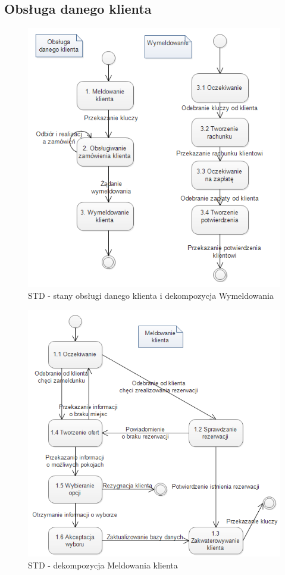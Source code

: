 \documentclass[a4paper, 11pt]{article}
\begin{document}
	\subsection{Obsługa danego klienta}
	\indent
	\begin{figure}[H]%
			\includegraphics[scale=1.0]{Img/STD-klient1.png}
			\caption{STD - stany obsługi danego klienta i dekompozycja Wymeldowania}
	\end{figure}
	\indent
	\begin{figure}[H]%
		\includegraphics[scale=1.0]{Img/STD-klient2.png}
		\caption{STD - dekompozycja Meldowania klienta}
	\end{figure}
\end{document}
